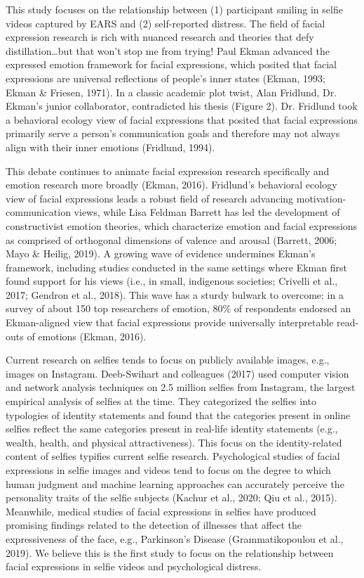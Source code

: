 \documentclass[authordate, empirical]{jote-new-article}
\begin{document}
This study focuses on the relationship between (1) participant smiling in selfie videos captured by EARS and (2) self-reported distress. The field of facial expression research is rich with nuanced research and theories that defy distillation…but that won't stop me from trying! Paul Ekman advanced the expressed emotion framework for facial expressions, which posited that facial expressions are universal reflections of people's inner states (Ekman, 1993; Ekman \& Friesen, 1971). In a classic academic plot twist, Alan Fridlund, Dr. Ekman's junior collaborator, contradicted his thesis (Figure 2). Dr. Fridlund took a behavioral ecology view of facial expressions that posited that facial expressions primarily serve a person's communication goals and therefore may not always align with their inner emotions (Fridlund, 1994).



This debate continues to animate facial expression research specifically and emotion research more broadly (Ekman, 2016). Fridlund's behavioral ecology view of facial expressions leads a robust field of research advancing motivation-communication views, while Lisa Feldman Barrett has led the development of constructivist emotion theories, which characterize emotion and facial expressions as comprised of orthogonal dimensions of valence and arousal (Barrett, 2006; Mayo \& Heilig, 2019). A growing wave of evidence undermines Ekman's framework, including studies conducted in the same settings where Ekman first found support for his views (i.e., in small, indigenous societies; Crivelli et al., 2017; Gendron et al., 2018). This wave has a sturdy bulwark to overcome: in a survey of about 150 top researchers of emotion, 80\% of respondents endorsed an Ekman-aligned view that facial expressions provide universally interpretable read-outs of emotions (Ekman, 2016).



Current research on selfies tends to focus on publicly available images, e.g., images on Instagram. Deeb-Swihart and colleagues (2017) used computer vision and network analysis techniques on 2.5 million selfies from Instagram, the largest empirical analysis of selfies at the time. They categorized the selfies into typologies of identity statements and found that the categories present in online selfies reflect the same categories present in real-life identity statements (e.g., wealth, health, and physical attractiveness). This focus on the identity-related content of selfies typifies current selfie research. Psychological studies of facial expressions in selfie images and videos tend to focus on the degree to which human judgment and machine learning approaches can accurately perceive the personality traits of the selfie subjects (Kachur et al., 2020; Qiu et al., 2015). Meanwhile, medical studies of facial expressions in selfies have produced promising findings related to the detection of illnesses that affect the expressiveness of the face, e.g., Parkinson's Disease (Grammatikopoulou et al., 2019). We believe this is the first study to focus on the relationship between facial expressions in selfie videos and psychological distress.
\end{document}
